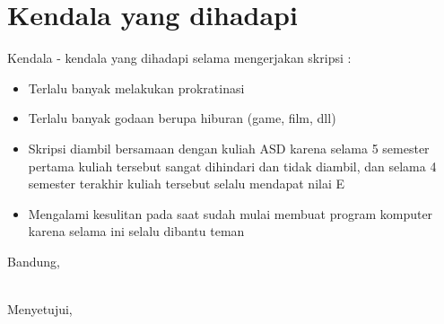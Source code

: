 \documentclass[a4paper,twoside]{article}
\begin{document}
\section{Kendala yang dihadapi}
Kendala - kendala yang dihadapi selama mengerjakan skripsi :
\begin{itemize}
	\item Terlalu banyak melakukan prokratinasi
	\item Terlalu banyak godaan berupa hiburan (game, film, dll)
	\item Skripsi diambil bersamaan dengan kuliah ASD karena selama 5 semester pertama kuliah tersebut sangat dihindari dan tidak diambil, dan selama 4 semester terakhir kuliah tersebut selalu mendapat nilai E
	\item Mengalami kesulitan pada saat sudah mulai membuat program komputer karena selama ini selalu dibantu teman
\end{itemize}

\vspace{1cm}
\centering Bandung, \tanggal\\
\vspace{2cm} \nama \\ 
\vspace{1cm}

Menyetujui, \\
\end{document}

